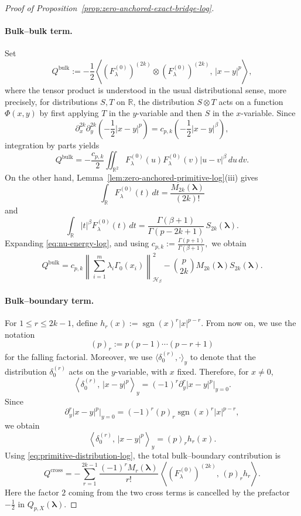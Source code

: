 \documentclass[10pt,a4paper]{amsart}
\begin{document}
\begin{proof}[Proof of Proposition~\ref{prop:zero-anchored-exact-bridge-log}]
\paragraph{Bulk--bulk term.}
Set
\[
Q^{\mathrm{bulk}}
:=
-\frac12\left\langle
(F_\lambda^{(0)})^{(2k)}\otimes (F_\lambda^{(0)})^{(2k)},
\,|x-y|^p
\right\rangle,
\]
where the tensor product is understood in the usual distributional sense, more precisely,
for distributions \(S,T\) on \(\mathbb R\), the distribution \(S\otimes T\) acts on a
function \(\Phi(x,y)\) by first applying \(T\) in the \(y\)-variable and then \(S\)
in the \(x\)-variable.
Since
\[
\partial_x^{2k}\partial_y^{2k}\left(-\frac12|x-y|^p\right)
=
c_{p,k}\left(-\frac12|x-y|^\beta\right),
\]
integration by parts yields
\[
Q^{\mathrm{bulk}}
=
-\frac{c_{p,k}}2
\iint_{\mathbb R^2}
F_\lambda^{(0)}(u)F_\lambda^{(0)}(v)|u-v|^\beta\,du\,dv.
\]
On the other hand, Lemma~\ref{lem:zero-anchored-primitive-log}\textnormal{(iii)} gives
\[
\int_{\mathbb R}F_\lambda^{(0)}(t)\,dt
=
\frac{M_{2k}(\boldsymbol\lambda)}{(2k)!}\]
and
\[
\int_{\mathbb R}|t|^\beta F_\lambda^{(0)}(t)\,dt
=
\frac{\Gamma(\beta+1)}{\Gamma(p-2k+1)}\,S_{2k}(\boldsymbol\lambda).
\]
Expanding \eqref{eq:nu-energy-log}, and using
\(c_{p,k}:=\frac{\Gamma(p+1)}{\Gamma(\beta+1)},\) we obtain
\begin{equation}\label{eq:bulk-identity-log}
Q^{\mathrm{bulk}}
=
c_{p,k}
\left\|\sum_{i=1}^m \lambda_i \Gamma_0(x_i)\right\|_{\mathcal H_\beta}^2
-
\binom{p}{2k}M_{2k}(\boldsymbol\lambda)S_{2k}(\boldsymbol\lambda).
\end{equation}

\paragraph{Bulk--boundary term.}
For $1\le r\le 2k-1$, define
\(
h_r(x):=\operatorname{sgn}(x)^r |x|^{p-r}.
\) From now on, we use the notation \[ (p)_r:=p(p-1)\cdots(p-r+1) \] for the falling factorial.
Moreover, we use \(\langle \delta_0^{(r)},\cdot\rangle_y\) to denote that the distribution \(\delta_0^{(r)}\) acts on the \(y\)-variable, with \(x\) fixed. Therefore, for \(x\neq0\),
\[
\left\langle \delta_0^{(r)},\,|x-y|^p\right\rangle_y = (-1)^r \partial_y^r |x-y|^p\big|_{y=0}.
\]
Since 
\[
\partial_y^r |x-y|^p\big|_{y=0} = (-1)^r (p)_r \operatorname{sgn}(x)^r |x|^{p-r},
\]
we obtain \[ \left\langle \delta_0^{(r)},\,|x-y|^p\right\rangle_y = (p)_r h_r(x). \]
Using \eqref{eq:primitive-distribution-log}, the total bulk--boundary contribution is
\[
Q^{\mathrm{cross}}
=
-\sum_{r=1}^{2k-1}\frac{(-1)^r M_r(\boldsymbol\lambda)}{r!}\,
\left\langle (F_\lambda^{(0)})^{(2k)},\,(p)_r h_r\right\rangle.
\]
Here the factor $2$ coming from the two cross terms is cancelled by the
prefactor $-\frac12$ in $Q_{p,X}(\boldsymbol\lambda)$.


\end{proof}
\end{document}
